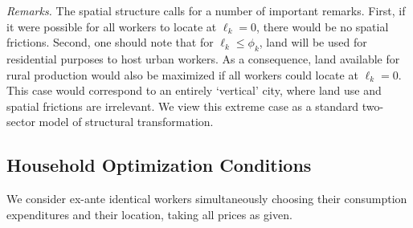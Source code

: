 \documentclass[20250130-paper.tex]{subfiles}
\begin{document}
\textit{Remarks.} The spatial structure calls for a number of important remarks. First, if it were possible for all workers to locate at $\ell_k=0$, there would be no spatial frictions. Second, one should note that for $\ell_k \leq \phi_k$, land will be used for residential purposes to host urban workers. As a consequence, land available for rural production would also be maximized if all workers could locate at $\ell_k=0$. This case would correspond to an entirely `vertical' city, where land use and spatial frictions are irrelevant. We view this extreme case as a standard two-sector model of structural transformation.

\subsection{Household Optimization Conditions}
\label{subsec:HHopt}

We consider ex-ante identical workers simultaneously choosing their consumption expenditures and their location, taking all prices as given.
\end{document}
